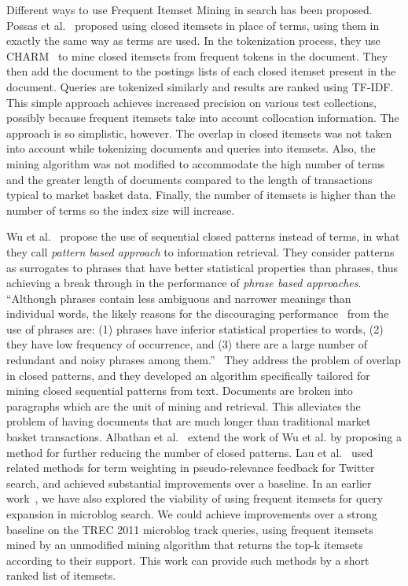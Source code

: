 \documentclass[letterpaper,12pt,titlepage,oneside,final]{book}
\begin{document}
Different ways to use Frequent Itemset Mining in search %
has been proposed. 
Possas et al.~\cite{possas2002set}  proposed using closed itemsets
in place of terms, using them in exactly the same way as terms are used.
In the tokenization process, they use CHARM~\cite{zaki2002charm} to mine closed itemsets from 
frequent tokens in the document.
They then add the document to the postings lists of each closed itemset
present in the document. 
Queries are tokenized similarly and results are ranked using TF-IDF.
This simple approach achieves increased precision on various test collections, 
possibly because frequent itemsets take into account collocation information.
The approach is so simplistic, however. 
The overlap in closed itemsets was not taken into account while tokenizing documents and queries into itemsets.
Also, the mining algorithm was not modified to accommodate the high number of terms %
and the greater length of documents compared to the length of transactions typical to market basket data.
Finally, the number of itemsets is higher than the number of terms so the index size will increase.

Wu et al.~\cite{wu2004automatic,wu2006deploying}
propose the use of sequential closed patterns instead of terms, 
in what they call \emph{pattern based approach} to information retrieval.
They consider patterns as surrogates to phrases that have
better statistical properties than phrases, 
thus achieving a break through in the performance 
of \emph{phrase based approaches}.
``Although phrases contain less ambiguous and narrower meanings than individual words, the likely
reasons for the discouraging performance~\cite{lewis1992evaluation} from the use of phrases are: (1) phrases have inferior statistical properties to words, (2) they have low frequency of occurrence, and (3) there are a large number of redundant and noisy phrases among them.''~\cite{wu2006deploying}
They address the problem of overlap in closed patterns,
and they developed an algorithm specifically tailored for mining closed sequential patterns from text.
Documents are broken into paragraphs which are the unit of mining and retrieval.
This alleviates the problem of having documents that are much longer than traditional market basket transactions.
Albathan et al.~\cite{albathan2012using} extend the work of Wu et al. by 
proposing a method for further reducing the number of closed patterns.
Lau et al.~\cite{laumicroblog} used related methods for term weighting 
in pseudo-relevance feedback for Twitter search,
and achieved substantial improvements over a baseline.
In an earlier work~\cite{abounlaga2012frequent}, 
we have also explored the viability 
of using frequent itemsets for query expansion in microblog search. 
We could achieve improvements over a strong baseline
on the TREC 2011 microblog track queries, 
using frequent itemsets 
mined by
an unmodified mining algorithm that 
returns the top-k itemsets according to their support.
This work can provide such methods by a short ranked list of itemsets. 
\end{document}
